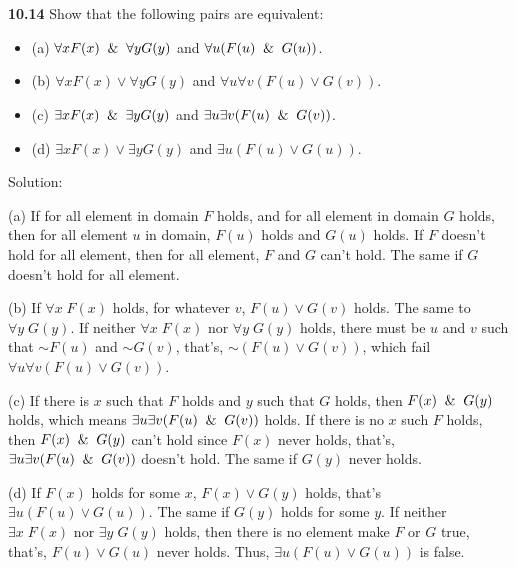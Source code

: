 \documentclass{ctexart}
\newcommand{\unsim}{\mathord{\sim}}
\begin{document}
\section*{}
\textbf{10.14}
Show that the following pairs are equivalent:
\begin{itemize}
\item (a) $\forall x F(x) \And \forall y G(y)$ and $\forall u(F(u) \And G(u))$.
\item (b) $\forall x F(x) \lor \forall y G(y)$ and $\forall u\forall v(F(u) \lor G(v))$.
\item (c) $\exists x F(x) \And \exists y G(y)$ and $\exists u\exists v(F(u) \And G(v))$.
\item (d) $\exists x F(x) \lor \exists y G(y)$ and $\exists u(F(u) \lor G(u))$.
\end{itemize}

Solution:

(a) If for all element in domain $F$ holds, and for all element in domain $G$ holds, then for all element $u$
in domain, $F(u)$ holds and $G(u)$ holds. If $F$ doesn't hold for all element,
then for all element, $F$ and $G$ can't hold. The same if $G$ doesn't hold for all element.

(b) If $\forall x\; F(x)$ holds, for whatever $v$, $F(u) \lor G(v)$ holds. The same to $\forall y\; G(y)$.
If neither $\forall x\; F(x)$ nor $\forall y\; G(y)$ holds, there must be $u$ and $v$ such that
$\unsim F(u)$ and $\unsim G(v)$, that's, $\unsim (F(u) \lor G(v))$, which fail $\forall u\forall v(F(u) \lor G(v))$.

(c) If there is $x$ such that $F$ holds and $y$ such that $G$ holds, then $F(x) \And G(y)$ holds, which means
$\exists u\exists v(F(u) \And G(v))$ holds. If there is no $x$ such $F$ holds, then $F(x) \And G(y)$ can't hold
since $F(x)$ never holds, that's, $\exists u\exists v(F(u) \And G(v))$ doesn't hold. The same if $G(y)$ never holds.

(d) If $F(x)$ holds for some $x$, $F(x) \lor G(y)$ holds, that's $\exists u(F(u) \lor G(u))$. The same if $G(y)$ holds
for some $y$. If neither $\exists x\; F(x)$ nor $\exists y\; G(y)$ holds, then there is no element make $F$ or $G$ true,
that's, $F(u) \lor G(u)$ never holds. Thus, $\exists u(F(u) \lor G(u))$ is false.
\end{document}
